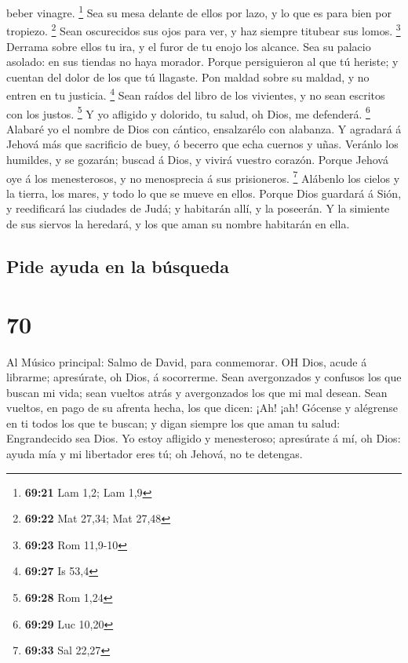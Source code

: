 beber vinagre. \footnote{\textbf{69:21} Lam 1,2; Lam 1,9} 
Sea su mesa delante de ellos por lazo, y lo que es para bien por
tropiezo. \footnote{\textbf{69:22} Mat 27,34; Mat 27,48} 
Sean oscurecidos sus ojos para ver, y haz siempre titubear sus lomos.
\footnote{\textbf{69:23} Rom 11,9-10}  Derrama sobre ellos
tu ira, y el furor de tu enojo los alcance.  Sea su palacio
asolado: en sus tiendas no haya morador.  Porque
persiguieron al que tú heriste; y cuentan del dolor de los que tú
llagaste.  Pon maldad sobre su maldad, y no entren en tu
justicia. \footnote{\textbf{69:27} Is 53,4}  Sean raídos
del libro de los vivientes, y no sean escritos con los justos.
\footnote{\textbf{69:28} Rom 1,24}  Y yo afligido y
dolorido, tu salud, oh Dios, me defenderá. \footnote{\textbf{69:29} Luc
  10,20}  Alabaré yo el nombre de Dios con cántico,
ensalzarélo con alabanza.  Y agradará á Jehová más que
sacrificio de buey, ó becerro que echa cuernos y uñas. 
Veránlo los humildes, y se gozarán; buscad á Dios, y vivirá vuestro
corazón.  Porque Jehová oye á los menesterosos, y no
menosprecia á sus prisioneros. \footnote{\textbf{69:33} Sal 22,27}
 Alábenlo los cielos y la tierra, los mares, y todo lo que
se mueve en ellos.  Porque Dios guardará á Sión, y
reedificará las ciudades de Judá; y habitarán allí, y la poseerán.
 Y la simiente de sus siervos la heredará, y los que aman
su nombre habitarán en ella.

\hypertarget{pide-ayuda-en-la-buxfasqueda}{%
\subsection{Pide ayuda en la
búsqueda}\label{pide-ayuda-en-la-buxfasqueda}}

\hypertarget{section-69}{%
\section{70}\label{section-69}}

 Al Músico principal: Salmo de David, para conmemorar. OH
Dios, acude á librarme; apresúrate, oh Dios, á socorrerme. 
Sean avergonzados y confusos los que buscan mi vida; sean vueltos atrás
y avergonzados los que mi mal desean.  Sean vueltos, en pago
de su afrenta hecha, los que dicen: ¡Ah! ¡ah!  Gócense y
alégrense en ti todos los que te buscan; y digan siempre los que aman tu
salud: Engrandecido sea Dios.  Yo estoy afligido y
menesteroso; apresúrate á mí, oh Dios: ayuda mía y mi libertador eres
tú; oh Jehová, no te detengas.

